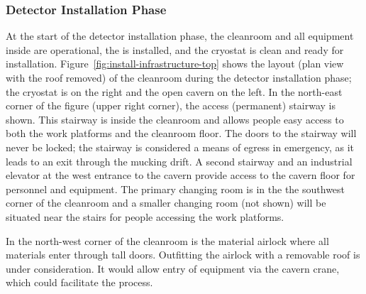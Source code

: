 \subsubsection{Detector Installation Phase}
\label{sec:fdsp-tc-inst-execute}

At the start of the detector installation phase, the cleanroom and all equipment inside are operational, the  is installed, and the cryostat is clean and ready for installation. 
Figure~\ref{fig:install-infrastructure-top} shows the layout (plan view with the roof removed) of the cleanroom during the detector installation phase; the cryostat is on the right and the open cavern on the left. 
In the north-east corner of the figure (upper right corner), the access  (permanent) stairway is shown. 
This stairway is inside the cleanroom and allows people easy access to both the work platforms and the cleanroom floor. 
The doors to the stairway will never be locked; the stairway is considered a means of egress in emergency, as it leads to an %
exit through the mucking drift.
A second stairway and an industrial elevator at the west entrance to the cavern provide access to the cavern floor for personnel and equipment. 
The primary changing room is in the the southwest corner of the cleanroom and a smaller changing room (not shown) will be situated %
near the stairs for people accessing the work platforms.

In the %
north-west corner of the cleanroom is the material airlock where all materials enter %
through tall doors. %
Outfitting the airlock with a removable roof is under consideration. It would allow entry of equipment via the cavern crane, which could facilitate the process.
 
